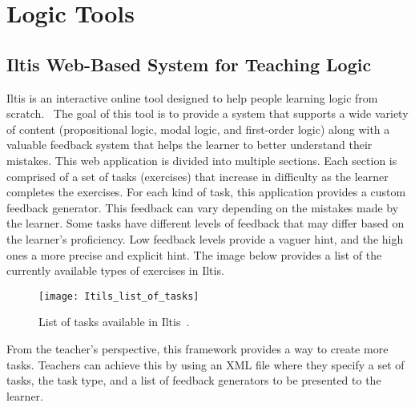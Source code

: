 
%

\chapter{Logic Tools}

\section{Iltis Web-Based System for Teaching Logic}

Iltis is an interactive online tool designed to help people learning logic from scratch.~\cite{arxivIltisLearning, arxiv} The goal of this tool is to provide a system that supports a wide variety of content (propositional logic, modal logic, and first-order logic) along with a valuable feedback system that helps the learner to better understand their mistakes. This web application is divided into multiple sections. Each section is comprised of a set of tasks (exercises) that increase in difficulty as the learner completes the exercises. For each kind of task, this application provides a custom feedback generator. This feedback can vary depending on the mistakes made by the learner. Some tasks have different levels of feedback that may differ based on the learner’s proficiency. Low feedback levels provide a vaguer hint, and the high ones a more precise and explicit hint. The image below provides a list of the currently available types of exercises in Iltis.

\begin{figure}[htbp]
    \centering
    \texttt{[image: Itils\_list\_of\_tasks]}
    \caption{List of tasks available in Iltis~\cite{arxiv}.}
\end{figure}

From the teacher’s perspective, this framework provides a way to create more tasks. Teachers can achieve this by using an XML file where they specify a set of tasks, the task type, and a list of feedback generators to be presented to the learner.

